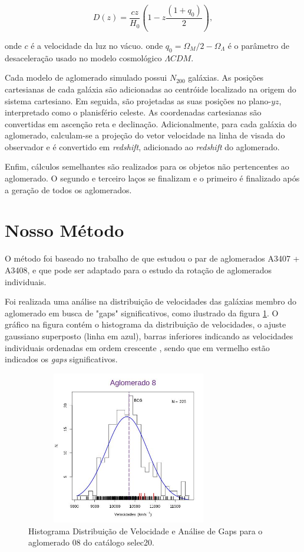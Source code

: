 \begin{equation}
D(z) = \frac{c z}{H_0} \left(1-z\frac{(1+q_0)}{2}   \right), 	
\label{distanciaaglomerado}
\end{equation}

\noindent onde $c$ é a velocidade da luz no vácuo.
onde $q_0 = \Omega_{M}/2 - \Omega_{\Lambda}$ é o parâmetro de desaceleração usado no modelo cosmológico $\Lambda CDM$.

Cada modelo de aglomerado simulado possui $N_{200}$ galáxias. As posições cartesianas de cada galáxia são adicionadas ao centróide localizado na origem do sistema cartesiano. Em seguida, são projetadas as suas posições no plano-$yz$, interpretado como o planisfério celeste. As coordenadas cartesianas são convertidas em ascenção reta e declinação. Adicionalmente, para cada galáxia do aglomerado, calculam-se a projeção do vetor velocidade na linha de visada do observador e é convertido em \textit{redshift}, adicionado ao \textit{redshift} do aglomerado. 

Enfim, cálculos semelhantes são realizados para os objetos não pertencentes ao aglomerado. O segundo e terceiro laços se finalizam e o primeiro é finalizado após a geração de todos os aglomerados.


\section{Nosso Método}
O método foi baseado no trabalho de  que estudou o par de aglomerados A3407 + A3408, e que pode ser adaptado para o estudo da rotação de aglomerados individuais. 

Foi realizada uma análise na distribuição de velocidades das galáxias membro do aglomerado em busca de "gaps" significativos, como ilustrado da figura \ref{fig:selec20gap}. O gráfico na figura contém o histograma da distribuição de velocidades, o ajuste gaussiano superposto (linha em azul), barras inferiores indicando as velocidades individuais ordenadas em ordem crescente , sendo que em vermelho estão indicados os \textit{gaps} significativos.

\begin{figure}[H] %
\vspace{-2pt}
\begin{center}
\includegraphics[height=6.7cm,width=9cm]{04-figuras/selec20gap}%
\caption{Histograma Distribuição de Velocidade e Análise de Gaps para o aglomerado 08 do catálogo selec20.}
\label{fig:selec20gap}%
\end{center}
\end{figure}

